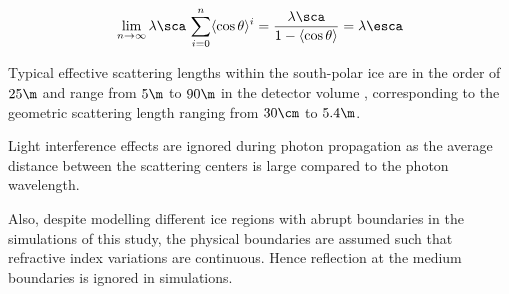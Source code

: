 $$ \lim_{n \rightarrow \infty} \lambda\sca\,\sum_{i=0}^n \meancostheta^i = \frac{\lambda\sca}{1 - \meancostheta} = \lambda\esca $$


Typical effective scattering lengths within the south-polar ice are in the order of $25\m$ \cite{lundberg} and range from $5\m$ to $90\m$ in the detector volume \cite{icepaper}, corresponding to the geometric scattering length ranging from $30\cm$ to $5.4\m$.

Light interference effects are ignored during photon propagation as the average distance between the scattering centers is large compared to the photon wavelength. \cite{ackermann}

Also, despite modelling different ice regions with abrupt boundaries in the simulations of this study, the physical boundaries are assumed such that refractive index variations are continuous. Hence reflection at the medium boundaries is ignored in simulations. \cite{lundberg}
